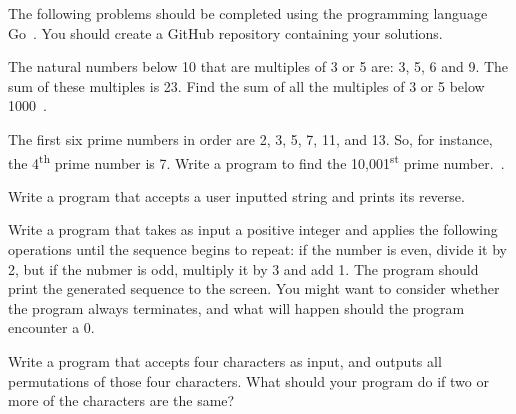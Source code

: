 

\noindent
The following problems should be completed using the programming language Go~\cite{gowebsite}.
You should create a GitHub repository containing your solutions.


\begin{questions}


\question
The natural numbers below 10 that are multiples of 3 or 5 are: 3, 5, 6 and 9.
The sum of these multiples is 23.
Find the sum of all the multiples of 3 or 5 below 1000~\cite{projecteuler}.
\begin{solution}
\end{solution}


\question
The first six prime numbers in order are 2, 3, 5, 7, 11, and 13.
So, for instance, the 4\textsuperscript{th} prime number is 7.
Write a program to find the 10,001\textsuperscript{st} prime number.~\cite{projecteuler}.


\question
Write a program that accepts a user inputted string and prints its reverse.
\begin{solution}
\end{solution}


\question
Write a program that takes as input a positive integer and applies the following operations until the sequence begins to repeat: if the number is even, divide it by 2, but if the nubmer is odd, multiply it by 3 and add 1.
The program should print the generated sequence to the screen.
You might want to consider whether the program always terminates, and what will happen should the program encounter a 0. 
\begin{solution}
\end{solution}


\question
Write a program that accepts four characters as input, and outputs all permutations of those four characters.
What should your program do if two or more of the characters are the same?
\begin{solution}
\end{solution}


\end{questions}

